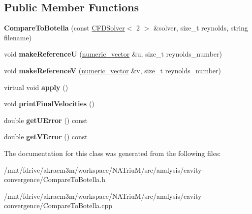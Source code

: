 \subsection*{Public Member Functions}
\begin{DoxyCompactItemize}
\item 
\hypertarget{classnatrium_1_1CompareToBotella_ad525363c302f82cd7cd24ae2b58130f8}{
{\bfseries CompareToBotella} (const \hyperlink{classnatrium_1_1CFDSolver}{CFDSolver}$<$ 2 $>$ \&solver, size\_\-t reynolds, string filename)}
\label{classnatrium_1_1CompareToBotella_ad525363c302f82cd7cd24ae2b58130f8}

\item 
\hypertarget{classnatrium_1_1CompareToBotella_a5b9c9fc30b852aa7898a955bf0ef10ff}{
void {\bfseries makeReferenceU} (\hyperlink{namespacenatrium_a67c39077adc6634f8fa3762b8eef24c4}{numeric\_\-vector} \&u, size\_\-t reynolds\_\-number)}
\label{classnatrium_1_1CompareToBotella_a5b9c9fc30b852aa7898a955bf0ef10ff}

\item 
\hypertarget{classnatrium_1_1CompareToBotella_a03a64dd371a6fc0c49d746b42eda001f}{
void {\bfseries makeReferenceV} (\hyperlink{namespacenatrium_a67c39077adc6634f8fa3762b8eef24c4}{numeric\_\-vector} \&v, size\_\-t reynolds\_\-number)}
\label{classnatrium_1_1CompareToBotella_a03a64dd371a6fc0c49d746b42eda001f}

\item 
\hypertarget{classnatrium_1_1CompareToBotella_aabd82dd44d264d2c371036c4c6b1feac}{
virtual void {\bfseries apply} ()}
\label{classnatrium_1_1CompareToBotella_aabd82dd44d264d2c371036c4c6b1feac}

\item 
\hypertarget{classnatrium_1_1CompareToBotella_ae85f948147a9926193c0b0cafdf37132}{
void {\bfseries printFinalVelocities} ()}
\label{classnatrium_1_1CompareToBotella_ae85f948147a9926193c0b0cafdf37132}

\item 
\hypertarget{classnatrium_1_1CompareToBotella_aafd836eb3e718419a6f68568d7565660}{
double {\bfseries getUError} () const }
\label{classnatrium_1_1CompareToBotella_aafd836eb3e718419a6f68568d7565660}

\item 
\hypertarget{classnatrium_1_1CompareToBotella_a40130eacc3d825616041e58426195fd7}{
double {\bfseries getVError} () const }
\label{classnatrium_1_1CompareToBotella_a40130eacc3d825616041e58426195fd7}

\end{DoxyCompactItemize}


The documentation for this class was generated from the following files:\begin{DoxyCompactItemize}
\item 
/mnt/fdrive/akraem3m/workspace/NATriuM/src/analysis/cavity-\/convergence/CompareToBotella.h\item 
/mnt/fdrive/akraem3m/workspace/NATriuM/src/analysis/cavity-\/convergence/CompareToBotella.cpp\end{DoxyCompactItemize}
